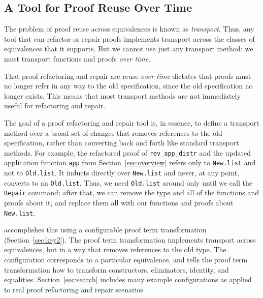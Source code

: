 \subsection{A Tool for Proof Reuse Over Time}
\label{sec:time}

The problem of proof reuse across equivalences is known as \textit{transport}. %
Thus, any tool that can refactor or repair proofs implements transport across the classes
of equivalences that it supports.
But we cannot use just any transport method: we must transport functions and proofs \textit{over time}.

That proof refactoring and repair are reuse \textit{over time} dictates that proofs
must no longer refer in any way to the old specification, since the old specification no longer exists.
This means that most transport methods %
are not immediately useful for refactoring and repair.

The goal of a proof refactoring and repair tool is, in essence, to
define a transport method over a broad set of changes that
removes references to the old specification, rather than converting back and forth
like standard transport methods.
For example, the refactored proof of \lstinline{rev_app_distr} and the updated application function \lstinline{app}
from Section~\ref{sec:overview} refers only to \lstinline{New.list} and not to \lstinline{Old.list}.
It inducts directly over \lstinline{New.list} and never, at any point, converts to an \lstinline{Old.list}.
Thus, we need \lstinline{Old.list} around only until we call the \lstinline{Repair} command;
after that, we can remove the type and all of the functions and proofs about it, and replace them all with
our functions and proofs about \lstinline{New.list}.

\toolname accomplishes this using a configurable proof term transformation (Section~\ref{sec:key2}).
The proof term transformation implements transport across equivalences, but in a way that removes
references to the old type.
The configuration corresponds to a particular equivalence, and tells the proof term transformation how to transform
constructors, eliminators, identity, and equalities.
Section~\ref{sec:search} includes many example configurations as applied to real proof refactoring and repair scenarios.


